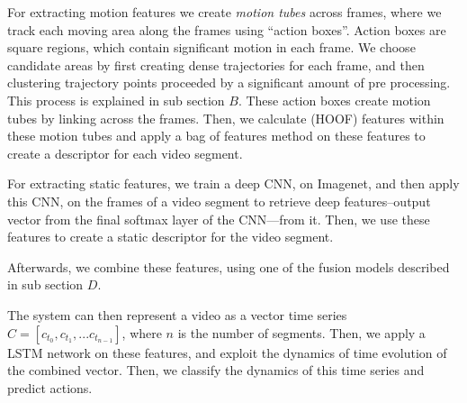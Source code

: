For extracting motion features we create \textit{motion tubes} across frames, where we track each moving area along the frames using ``action boxes''.
Action boxes are square regions, which contain significant motion in each frame. We choose candidate areas by first creating dense trajectories for each frame,
and then clustering trajectory points proceeded by a significant amount of pre processing. This process is explained in sub section $B$.
These action boxes create motion tubes by linking across the frames. Then, we calculate (HOOF)\cite{chaudhry2009histograms} features within these motion tubes and apply a
bag of features
method on these features to create a descriptor for each video segment.

For extracting static features, we train a deep CNN, on Imagenet, and then apply this CNN,
on the frames of a video segment to retrieve deep features--output vector from the final softmax layer of the CNN---from it. Then, we use these features
to create a static descriptor for the video segment.

Afterwards, we combine these features, using one of the fusion models described in sub section $D$.

The system can then represent a video as a vector time series $C = [c_{t_0}, c_{t_1}, ...c_{t_{n-1}}]$,
where $n$ is the number of segments. Then, we apply a LSTM network on these features, and exploit the dynamics of time evolution of the combined vector.
Then, we classify the dynamics of this time series and predict actions.



